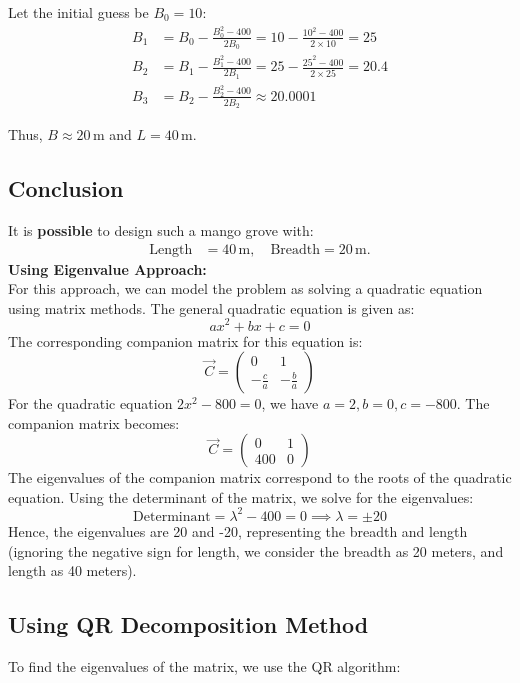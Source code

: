 \documentclass[journal]{IEEEtran}
\begin{document}
Let the initial guess be \( B_0 = 10 \):
\begin{align}
    B_1 &= B_0 - \frac{B_0^2 - 400}{2B_0} = 10 - \frac{10^2 - 400}{2 \times 10} = 25 \\
    B_2 &= B_1 - \frac{B_1^2 - 400}{2B_1} = 25 - \frac{25^2 - 400}{2 \times 25} = 20.4 \\
    B_3 &= B_2 - \frac{B_2^2 - 400}{2B_2} \approx 20.0001
\end{align}

Thus, \( B \approx 20 \, \text{m} \) and \( L = 40 \, \text{m} \).

\subsection*{Conclusion}
It is \textbf{possible} to design such a mango grove with:
\begin{align}
    \text{Length} &= 40 \, \text{m}, \quad \text{Breadth} = 20 \, \text{m}.
\end{align}
\textbf{Using Eigenvalue Approach:} \\
    For this approach, we can model the problem as solving a quadratic equation using matrix methods. The general quadratic equation is given as:
    \[
    ax^2 + bx + c = 0
    \]
    The corresponding companion matrix for this equation is:
    \[
    \vec{C} = \begin{pmatrix} 0 & 1 \\ -\frac{c}{a} & -\frac{b}{a} \end{pmatrix}
    \]
    For the quadratic equation \( 2x^2 - 800 = 0 \), we have \( a = 2, b = 0, c = -800 \). The companion matrix becomes:
    \[
    \vec{C} = \begin{pmatrix} 0 & 1 \\ 400 & 0 \end{pmatrix}
    \]
    The eigenvalues of the companion matrix correspond to the roots of the quadratic equation. Using the determinant of the matrix, we solve for the eigenvalues:
    \[
    \text{Determinant} = \lambda^2 - 400 = 0 \implies \lambda = \pm 20
    \]
    Hence, the eigenvalues are 20 and -20, representing the breadth and length (ignoring the negative sign for length, we consider the breadth as 20 meters, and length as 40 meters).
    \subsection*{Using QR Decomposition Method}
To find the eigenvalues of the matrix, we use the QR algorithm:
\end{document}
